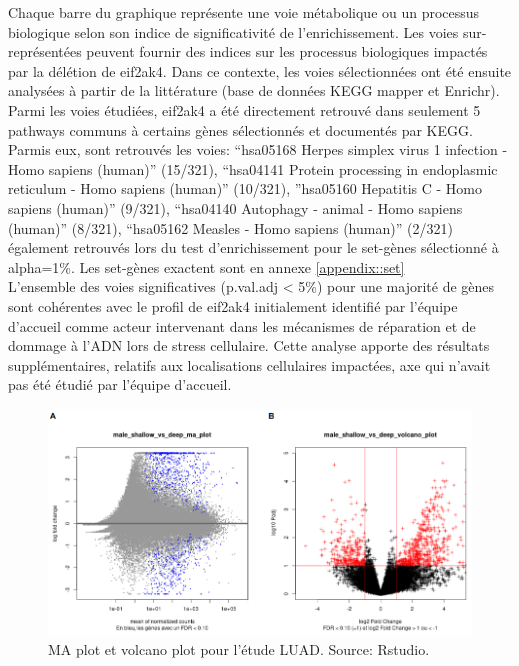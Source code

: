 \documentclass{style}
\begin{document}
Chaque barre du graphique représente une voie métabolique ou un processus biologique selon son indice de significativité de l'enrichissement. Les voies sur-représentées peuvent fournir des indices sur les processus biologiques impactés par la délétion de eif2ak4. Dans ce contexte, les voies sélectionnées ont été ensuite analysées à partir de la littérature (base de données KEGG mapper et Enrichr). Parmi les voies étudiées, eif2ak4 a été directement retrouvé dans seulement 5 pathways communs à certains gènes sélectionnés et documentés par KEGG. Parmis eux, sont retrouvés les voies: “hsa05168 Herpes simplex virus 1 infection - Homo sapiens (human)” (15/321), “hsa04141 Protein processing in endoplasmic reticulum - Homo sapiens (human)” (10/321), ”hsa05160 Hepatitis C - Homo sapiens (human)” (9/321), “hsa04140 Autophagy - animal - Homo sapiens (human)” (8/321), “hsa05162 Measles - Homo sapiens (human)” (2/321) également retrouvés lors du test d’enrichissement pour le set-gènes sélectionné à alpha=1\%. Les set-gènes exactent sont en annexe \ref{appendix::set}\\
L’ensemble des voies significatives (p.val.adj < 5\%) pour une majorité de gènes sont cohérentes avec le profil de eif2ak4 initialement identifié par l’équipe d'accueil comme acteur intervenant dans les mécanismes de réparation et de dommage à l’ADN lors de stress cellulaire. Cette analyse apporte des résultats supplémentaires, relatifs aux localisations cellulaires impactées, axe qui n'avait pas été étudié par l’équipe d'accueil. \\

\begin{figure}[H]
  \centering
  \includegraphics[width=16cm]{images/figures/volcano.png}
  \caption[MA plot et volcano plot pour l’étude LUAD.]{MA plot et volcano plot pour l’étude LUAD. Source: Rstudio.}
  \label{fig:volcano}
\end{figure}
\end{document}
